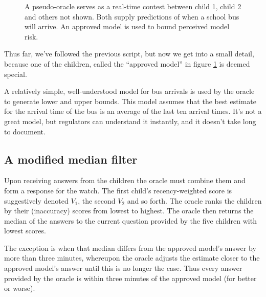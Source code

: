 \begin{figure}
\hspace{30mm}
\iftikz 
{}
\else 
\fi 
\hspace{30mm}
\caption{A pseudo-oracle serves as a real-time contest between child 1, child 2 and others not shown. Both supply predictions of when a school bus will arrive. An approved model is used to bound perceived model risk.}
\label{fig:bus}
\end{figure}

Thus far, we've followed the previous script, but now we get into a small detail, because one of the children, called the ``approved model'' in figure \ref{fig:bus} is deemed special. 

A relatively simple, well-understood model for bus arrivals is used by the oracle to generate lower and upper bounds. This model assumes that the best estimate for the arrival time of the bus is an average of the last ten arrival times. It's not a great model, but regulators can understand it instantly, and it doesn't take long to document.   

\subsection{A modified median filter}

Upon receiving answers from the children the oracle must combine them and form a response for the watch. The first child's recency-weighted score is suggestively denoted $V_1$, the second $V_2$ and so forth. The oracle ranks the children by their (inaccuracy) scores from lowest to highest. The oracle then returns the median of the answers to the current question provided by the five children with lowest scores.

The exception is when that median differs from the approved model's answer by more than three minutes, whereupon the oracle adjusts the estimate closer to the approved model's answer until this is no longer the case. Thus every answer provided by the oracle is within three minutes of the approved model (for better or worse).  

